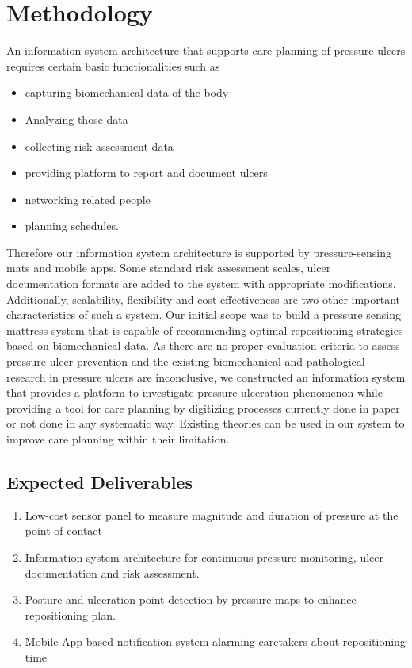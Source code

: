 \chapter{Methodology}
\label{chapter:method}

An information system architecture that supports care planning of pressure ulcers requires certain basic functionalities such as 
\begin{itemize}
	\item capturing biomechanical data of the body
	\item Analyzing those data
	\item collecting risk assessment data
	\item providing platform to report and document ulcers
	\item networking related people
	\item planning schedules.
\end{itemize}

Therefore our information system architecture is supported by pressure-sensing mats and mobile apps. Some standard risk assessment scales, ulcer documentation formats are added to the system with appropriate modifications. Additionally, scalability, flexibility and cost-effectiveness are two other important characteristics of such a system. Our initial scope was to build a pressure sensing mattress system that is capable of recommending optimal repositioning strategies based on biomechanical data. As there are no proper evaluation criteria to assess pressure ulcer prevention and the existing biomechanical and pathological research in pressure ulcers are inconclusive, we constructed an information system that provides a platform to investigate pressure ulceration phenomenon while providing a tool for care planning by digitizing processes currently done in paper or not done in any systematic way. Existing theories can be used in our system to improve care planning within their limitation.

\section{Expected Deliverables}
\begin{enumerate}
	\item Low-cost sensor panel to measure magnitude and duration of pressure at the point of contact
	\item Information system architecture for continuous pressure monitoring, ulcer documentation and risk assessment.
	\item Posture and ulceration point detection by pressure maps to enhance repositioning plan.
	\item Mobile App based notification system alarming caretakers about repositioning time
\end{enumerate}

